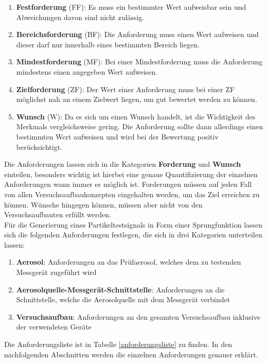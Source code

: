 \begin{enumerate}
	\item \textbf{Festforderung} (FF): Es muss ein bestimmter Wert aufweisbar sein und Abweichungen davon sind nicht zul\"{a}ssig.
	
	\item \textbf{Bereichsforderung} (BF): Die Anforderung muss einen Wert aufweisen und dieser darf nur innerhalb eines bestimmten Bereich liegen.
	
	\item \textbf{Mindestforderung} (MF): Bei einer Mindestforderung muss die Anforderung mindestens einen angegeben Wert aufweisen.
	
	\item \textbf{Zielforderung} (ZF): Der Wert einer Anforderung muss bei einer ZF m\"{o}glichst nah an einem Zielwert liegen, um gut bewertet werden zu k\"{o}nnen.
	
	\item \textbf{Wunsch} (W): Da es sich um einen Wunsch handelt, ist die Wichtigkeit des Merkmals vergleichsweise gering. Die Anforderung sollte dann allerdings einen bestimmten Wert aufweisen und wird bei der Bewertung positiv ber\"{u}cksichtigt. 
\end{enumerate}
Die Anforderungen lassen sich in die Kategorien \textbf{Forderung} und \textbf{Wunsch} einteilen, besonders wichtig ist hierbei eine genaue Quantifizierung der einzelnen Anforderungen wann immer es m\"{o}glich ist. Forderungen m\"{u}ssen auf jeden Fall von allen Versuchsaufbaukonzepten eingehalten werden, um das Ziel erreichen zu k\"{o}nnen. W\"{u}nsche hingegen k\"{o}nnen, m\"{u}ssen aber nicht von den Versuchsaufbauten erf\"{u}llt werden.\\
F\"{u}r die Generierung eines Partikeltestsignals in Form einer Sprungfunktion lassen sich die folgenden Anforderungen festlegen, die sich in drei Kategorien unterteilen lassen:
\begin{enumerate}
	\item \textbf{Aerosol}: Anforderungen an das Pr\"{u}faerosol, welches dem zu testenden Messger\"{a}t zugef\"{u}hrt wird
	\item \textbf{Aerosolquelle-Messger\"{a}t-Schnittstelle}: Anforderungen an die Schnittstelle, welche die Aerosolquelle mit dem Messger\"{a}t verbindet
	\item \textbf{Versuchsaufbau}: Anforderungen an den gesamten Versuchsaufbau inklusive der verwendeten Ger\"{a}te
\end{enumerate}
Die Anforderungsliste ist in Tabelle \ref{anforderungsliste} zu finden. In den nachfolgenden Abschnitten werden die einzelnen Anforderungen genauer erkl\"{a}rt.

